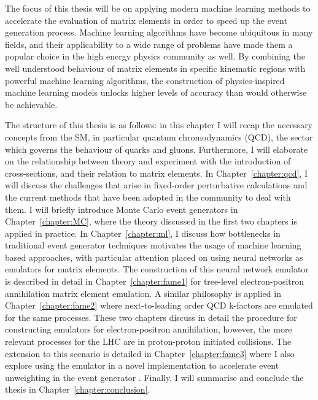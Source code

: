 \documentclass[main.tex]{subfiles}
\begin{document}
The focus of this thesis will be on applying modern
machine learning methods to accelerate the evaluation
of matrix elements in order to speed up the event
generation process. Machine learning algorithms
have become ubiquitous in many fields, and their applicability
to a wide range of problems have made them a popular choice
in the high energy physics community as well. By combining the
well understood behaviour of matrix elements in specific
kinematic regions with powerful machine learning
algorithms, the construction of physics-inspired machine
learning models unlocks higher levels of accuracy
than would otherwise be achievable.

The structure of this thesis is as follows: in this chapter
I will recap the necessary concepts from the SM,
in particular quantum chromodynamics (QCD), the sector
which governs the behaviour of quarks and gluons. Furthermore,
I will elaborate on the relationship between theory and experiment
with the introduction of cross-sections, and their relation
to matrix elements.
In Chapter~\ref{chapter:qcd}, I will discuss the challenges that arise
in fixed-order perturbative calculations and the current methods
that have been adopted in the community to deal with them.
I will briefly introduce Monte Carlo event generators in
Chapter~\ref{chapter:MC}, where the theory discussed in the first
two chapters is applied in practice. In Chapter~\ref{chapter:ml},
I discuss how bottlenecks in traditional event generator techniques
motivates the usage of machine learning based approaches, with
particular attention placed on using neural networks as emulators
for matrix elements.
The construction of this neural network emulator is
described in detail in Chapter~\ref{chapter:fame1} for tree-level
electron-positron annihilation matrix element emulation.
A similar philosophy is applied in Chapter~\ref{chapter:fame2}
where next-to-leading order QCD k-factors are emulated for
the same processes.
These two chapters discuss in detail the procedure for
constructing emulators for electron-positron annihilation,
however, the more relevant processes for the LHC are in
proton-proton initiated collisions. The extension
to this scenario is detailed in Chapter~\ref{chapter:fame3}
where I also explore using the
emulator in a novel implementation to accelerate event unweighting
in the event generator {\Sherpa}.
Finally, I will summarise and conclude the thesis in
Chapter~\ref{chapter:conclusion}.
\end{document}
